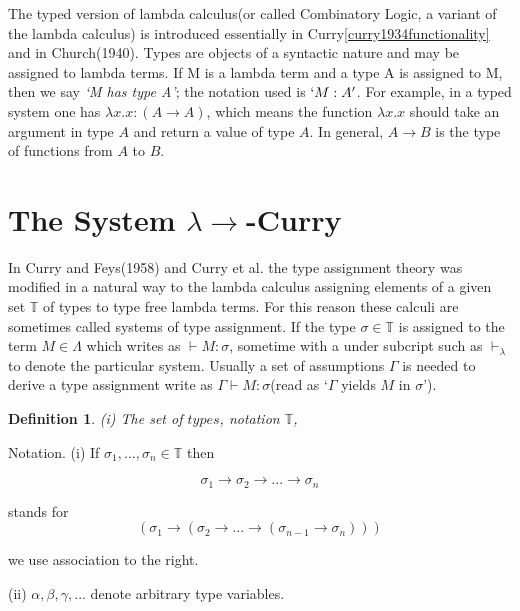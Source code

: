 \documentclass[a4paper,11pt,twoside]{report}
\newtheorem{def1}{\textbf{Definition}}[chapter]
\begin{document}
The typed version of lambda calculus(or called Combinatory Logic, a variant of the lambda calculus) is introduced essentially in Curry\ref{curry1934functionality} and in Church(1940). Types are objects of a syntactic nature and may be assigned to lambda terms. If M is a lambda term and a type A is assigned to M, then we say \textit{`M has type A'}; the notation used is $`M:A'$. For example, in a typed system one has $\lambda x.x : (A \rightarrow A)$, which means the function $\lambda x.x$ should take an argument in type $A$ and return a value of type $A$. In general, $A \rightarrow B$ is the type of functions from $A$ to $B$.

\section{The System $\lambda \rightarrow $-Curry}

In Curry and Feys(1958) and Curry et al. the type assignment theory was modified in a natural way to the lambda calculus assigning elements of a given set $\mathbb{T}$ of types to type free lambda terms. For this reason these calculi are sometimes called systems of type assignment. If the type $\sigma \in \mathbb{T}$ is assigned to the term $M \in \Lambda$ which writes as $\vdash M : \sigma$, sometime with a under subcript such as $\vdash _\lambda$ to denote the particular system. Usually a set of assumptions $\Gamma$ is needed to derive a type assignment write as $\Gamma \vdash M : \sigma$(read as `$\Gamma$ yields $M$ in $\sigma$').

\begin{def1}
\normalfont (i) The set of $types$, notation $\mathbb{T}$, 
\end{def1} 

Notation. (i) If $\sigma _1,...,\sigma _n \in \mathbb{T}$ then

\begin{equation*}
\sigma _1 \rightarrow \sigma _2 \rightarrow ... \rightarrow \sigma _n
\end{equation*}

\noindent stands for
\begin{equation*}
(\sigma _1 \rightarrow (\sigma _2 \rightarrow ... \rightarrow (\sigma _{n-1} \rightarrow \sigma _n)))
\end{equation*}

\noindent we use association to the right.

     (ii) $\alpha,\beta,\gamma,...$ denote arbitrary type variables.
\end{document}
